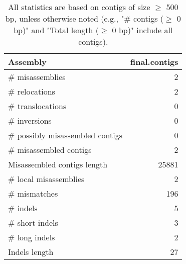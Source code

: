 \documentclass[12pt,a4paper]{article}
\begin{document}
\begin{table}[ht]
\begin{center}
\caption{All statistics are based on contigs of size $\geq$ 500 bp, unless otherwise noted (e.g., "\# contigs ($\geq$ 0 bp)" and "Total length ($\geq$ 0 bp)" include all contigs).}
\begin{tabular}{|l*{1}{|r}|}
\hline
Assembly & final.contigs \\ \hline
\# misassemblies & 2 \\ \hline
\hspace{5mm}\# relocations & 2 \\ \hline
\hspace{5mm}\# translocations & 0 \\ \hline
\hspace{5mm}\# inversions & 0 \\ \hline
\# possibly misassembled contigs & 0 \\ \hline
\# misassembled contigs & 2 \\ \hline
Misassembled contigs length & 25881 \\ \hline
\# local misassemblies & 2 \\ \hline
\# mismatches & 196 \\ \hline
\# indels & 5 \\ \hline
\hspace{5mm}\# short indels & 3 \\ \hline
\hspace{5mm}\# long indels & 2 \\ \hline
Indels length & 27 \\ \hline
\end{tabular}
\end{center}
\end{table}
\end{document}
